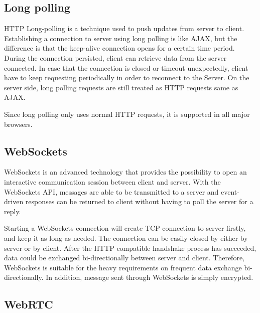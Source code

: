 



\subsection{Long polling}
HTTP Long-polling is a technique used to push updates from server to client. Establishing a connection to server using long polling is like AJAX, but the difference is that the keep-alive connection opens for a certain time period. During the connection persisted, client can retrieve data from the server connected. In case that the connection is closed or timeout unexpectedly, client have to keep requesting periodically in order to reconnect to the Server. On the server side, long polling requests are still treated as HTTP requests same as AJAX. 

Since long polling only uses normal HTTP requests, it is supported in all major browsers.


\subsection{WebSockets}

WebSockets is an advanced technology that provides the possibility to open an interactive communication session between client and server\cite{Websocket}. With the WebSockets API, messages are able to be transmitted to a server and event-driven responses can be returned to client without having to poll the server for a reply.

Starting a WebSockets connection will create TCP connection to server firstly, and keep it as long as needed. The connection can be easily closed by either by server or by client. After the HTTP compatible handshake process has succeeded,  data could be exchanged bi-directionally between server and client. Therefore, WebSockets is suitable for the heavy requirements on frequent data exchange bi-directionally. In addition, message sent through WebSockets is simply encrypted\cite{pimentel2012communicating}.


\subsection{WebRTC}

